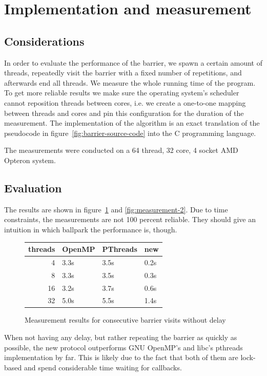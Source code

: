 \documentclass[a4paper, 10pt]{article}
\begin{document}
\clearpage

\section{Implementation and measurement}
\subsection{Considerations}
In order to evaluate the performance of the barrier, we spawn a certain amount of threads, repeatedly visit the barrier with a fixed number of repetitions, and afterwards end all threads. We measure the whole running time of the program. To get more reliable results we make sure the operating system's scheduler cannot reposition threads between cores, i.e. we create a one-to-one mapping between threads and cores and pin this configuration for the duration of the measurement. The implementation of the algorithm is an exact translation of the pseudocode in figure~\ref{fig:barrier-source-code} into the C programming language.

The measurements were conducted on a 64 thread, 32 core, 4 socket AMD Opteron system.
\subsection{Evaluation}
The results are shown in figure~\ref{fig:measurement-1} and \ref{fig:measurement-2}. Due to time constraints, the measurements are not 100 percent reliable. They should give an intuition in which ballpark the performance is, though.
\begin{figure}[htbp]
	\centering
	\begin{tabular}{r | l l l }
		threads & OpenMP  & PThreads  & new \\
		\hline
		 4      & 3.3s    & 3.5s      & 0.2s \\
		 8      & 3.3s    & 3.5s      & 0.3s \\
		16      & 3.2s    & 3.7s      & 0.6s \\
		32      & 5.0s    & 5.5s      & 1.4s \\
	\end{tabular}
	\caption{Measurement results for consecutive barrier visits without delay}
	\label{fig:measurement-1}
\end{figure}

When not having any delay, but rather repeating the barrier as quickly as possible, the new protocol outperforms GNU OpenMP's and libc's pthreads implementation by far. This is likely due to the fact that both of them are lock-based and spend considerable time waiting for callbacks.
\end{document}
